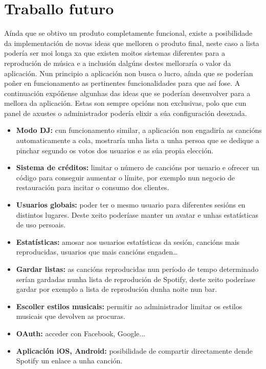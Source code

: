 \section{Traballo futuro}
Aínda que se obtivo un produto completamente funcional, existe a posibilidade da implementación de novas ideas que melloren o produto final, neste caso a lista podería ser moi longa xa que existen moitos sistemas diferentes para a reprodución de música e a inclusión dalgúns destes melloraría o valor da aplicación. Nun principio a aplicación non busca o lucro, aínda que se poderían poñer en funcionamento as pertinentes funcionalidades para que así fose. A continuación expóñense algunhas das ideas que se poderían desenvolver para a mellora da aplicación. Estas son sempre opcións non exclusivas, polo que cun panel de axustes o administrador podería elixir a súa configuración desexada. 
\begin{itemize}
	\item \textbf{Modo DJ:} cun funcionamento similar, a aplicación non engadiría as cancións automaticamente a cola, mostraría unha lista a unha persoa que se dedique a pinchar segundo os votos dos usuarios e as súa propia elección.
	\item \textbf{Sistema de créditos:} limitar o número de cancións por usuario e ofrecer un código para conseguir aumentar o límite, por exemplo nun negocio de restauración para incitar o consumo dos clientes.
	\item \textbf{Usuarios globais:} poder ter o mesmo usuario para diferentes sesións en distintos lugares. Deste xeito poderíase manter un avatar e unhas estatísticas de uso persoais.
	\item \textbf{Estatísticas:} amosar aos usuarios estatísticas da sesión, cancións mais reproducidas, usuarios que mais cancións engaden\dots
	\item \textbf{Gardar listas:} as cancións reproducidas nun período de tempo determinado serían gardadas nunha lista de reprodución de Spotify, deste xeito poderíase gardar por exemplo a lista de reprodución dunha noite nun bar.
	\item \textbf{Escoller estilos musicais:} permitir ao administrador limitar os estilos musicais que devolven as procuras.
	\item \textbf{OAuth:} acceder con Facebook, Google...
	\item \textbf{Aplicación iOS, Android:} posibilidade de compartir directamente dende Spotify un enlace a unha canción.
\end{itemize}

